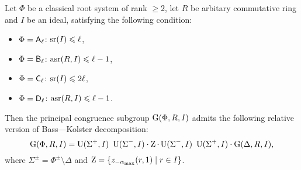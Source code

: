 \begin{thm}\label{thm:BassKolster}
Let $\Phi$ be a classical root system of rank $\geqslant2$, let $R$ be arbitary commutative ring and $I$ be an ideal, satisfying the following condition:
\begin{itemize}
\item $\Phi=\mathsf{A}_\ell$: $\operatorname{sr}(I)\leqslant\ell$,
\item $\Phi=\mathsf{B}_\ell$: $\operatorname{asr}(R,I)\leqslant\ell-1$,
\item $\Phi=\mathsf{C}_\ell$: $\operatorname{sr}(I)\leqslant2\ell$,
\item $\Phi=\mathsf{D}_\ell$: $\operatorname{asr}(R,I)\leqslant\ell-1$.
\end{itemize}
Then the principal congruence subgroup $\operatorname{G}(\Phi,R,I)$ admits the following relative version of Bass---Kolster decomposition:
\[\operatorname{G}(\Phi,R,I)=\operatorname{U}(\Sigma^+,I)\ \operatorname{U}(\Sigma^-,I)\cdot \operatorname{Z}\cdot \operatorname{U}(\Sigma^-,I)\ \operatorname{U}(\Sigma^+,I)\cdot \operatorname{G}(\Delta,R,I), \]
where $\Sigma^\pm=\Phi^\pm\setminus\Delta$ and $\operatorname{Z}=\{ z_{-\alpha_\mathrm{max}}(r,1)\mid r\in I \}$.
\end{thm}
